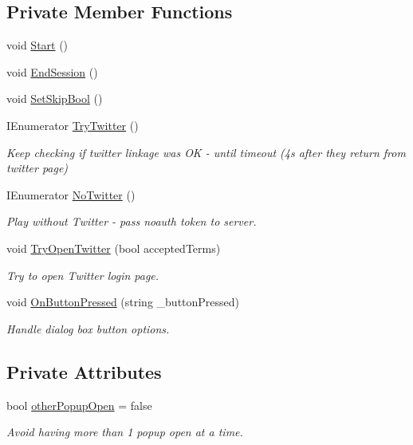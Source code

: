 \subsection*{Private Member Functions}
\begin{DoxyCompactItemize}
\item 
void \mbox{\hyperlink{class_login_twitter_aa93b8ee84e787d99c171d9086c64275c}{Start}} ()
\item 
void \mbox{\hyperlink{class_login_twitter_ac489a3bf63140ddcc50d9a10f70409d1}{End\+Session}} ()
\item 
void \mbox{\hyperlink{class_login_twitter_a6291e32f19d1cae3ea13e08b5401960f}{Set\+Skip\+Bool}} ()
\item 
I\+Enumerator \mbox{\hyperlink{class_login_twitter_a45104792188cdefa496e01daf069a9e9}{Try\+Twitter}} ()
\begin{DoxyCompactList}\small\item\em Keep checking if twitter linkage was OK -\/ until timeout (4s after they return from twitter page) \end{DoxyCompactList}\item 
I\+Enumerator \mbox{\hyperlink{class_login_twitter_af7789cc9f8f7b7b541b7b78ce125944b}{No\+Twitter}} ()
\begin{DoxyCompactList}\small\item\em Play without Twitter -\/ pass noauth token to server. \end{DoxyCompactList}\item 
void \mbox{\hyperlink{class_login_twitter_a61c2451a8162c3b5e3e7f4fbec0940c1}{Try\+Open\+Twitter}} (bool accepted\+Terms)
\begin{DoxyCompactList}\small\item\em Try to open Twitter login page. \end{DoxyCompactList}\item 
void \mbox{\hyperlink{class_login_twitter_a93f9df661ee558c415ad4bd1aeea4555}{On\+Button\+Pressed}} (string \+\_\+button\+Pressed)
\begin{DoxyCompactList}\small\item\em Handle dialog box button options. \end{DoxyCompactList}\end{DoxyCompactItemize}
\subsection*{Private Attributes}
\begin{DoxyCompactItemize}
\item 
bool \mbox{\hyperlink{class_login_twitter_af567aa064be62c7c71fdd375d5f46b10}{other\+Popup\+Open}} = false
\begin{DoxyCompactList}\small\item\em Avoid having more than 1 popup open at a time. \end{DoxyCompactList}\end{DoxyCompactItemize}


